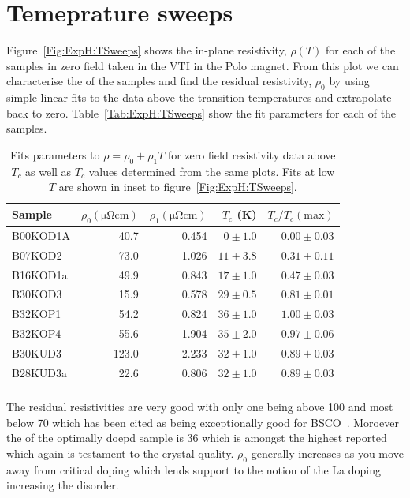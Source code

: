 \section{Temeprature sweeps}

Figure~\ref{Fig:ExpH:TSweeps} shows the in-plane resistivity, $\rho(T)$ for each of the samples in zero field taken in the \ac{VTI} in the Polo magnet. From this plot we can characterise the \Tc of the samples and find the residual resistivity, $\rho_0$ by using simple linear fits to the data above the transition temperatures and extrapolate back to zero. Table~\ref{Tab:ExpH:TSweeps} show the fit parameters for each of the samples. 
\begin{table}
	\begin{center}
       	\caption{Fits parameters to $\rho = \rho_0 + \rho_1T$ for zero field resistivity data above $T_c$ as well as $T_c$ values determined from the same plots. Fits at low $T$ are shown in inset to figure~\ref{Fig:ExpH:TSweeps}.}
		\begin{tabular}[htbp]{lrrrr}
\toprule
Sample		& $\rho_0 (\unit{\micro\ohm\centi\metre})$	& $\rho_1 (\unit{\micro\ohm\centi\metre})$  & $T_c$ (\unit{\kelvin})	& $T_c/T_c(\textrm{max})$	\\
\midrule
B00KOD1A	& 40.7		& 0.454     & $0\pm1.0$	    & $0.00\pm0.03$	\\
B07KOD2		& 73.0		& 1.026     & $11\pm3.8$	& $0.31\pm0.11$	\\
B16KOD1a	& 49.9		& 0.843     & $17\pm1.0$	& $0.47\pm0.03$	\\
B30KOD3		& 15.9		& 0.578     & $29\pm0.5$	& $0.81\pm0.01$	\\
B32KOP1		& 54.2		& 0.824     & $36\pm1.0$	& $1.00\pm0.03$	\\
B32KOP4		& 55.6		& 1.904     & $35\pm2.0$	& $0.97\pm0.06$	\\
B30KUD3		& 123.0		& 2.233     & $32\pm1.0$	& $0.89\pm0.03$ \\
B28KUD3a	& 22.6		& 0.806     & $32\pm1.0$	& $0.89\pm0.03$	\\
\bottomrule
		\label{Table:ExpH:TSweepFitsParams}
		\end{tabular}
	\end{center}
\end{table}
The residual resistivities are very good with only one being above \unit{100}{\micro\ohm\centi\metre} and most below \unit{70}{\micro\ohm\centi\metre} which has been cited as being exceptionally good for \ac{BSCO}~\cite{Ando1999}. Moroever the \Tc of the optimally doepd sample is \unit{36}{\kelvin} which is amongst the highest reported~\cite{Ando1999} which again is testament to the crystal quality. $\rho_0$ generally increases as you move away from critical doping which lends support to the notion of the La doping increasing the disorder.


